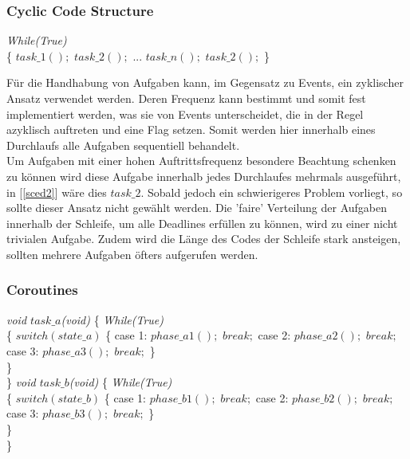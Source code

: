 \subsubsection{Cyclic Code Structure}
\begin{algorithm}
\label{sced2}
\begin{algorithmic}[1]

\BState \textit{While(True)}\\
\{
\State $task\_1();$
\State $task\_2();$
\State ...
\State $task\_n();$
\State $task\_2();$
\}

\end{algorithmic}
\end{algorithm}

Für die Handhabung von Aufgaben kann, im Gegensatz zu Events, ein zyklischer Ansatz verwendet werden. Deren Frequenz kann bestimmt und somit fest implementiert werden, was sie von Events unterscheidet, die in der Regel azyklisch auftreten und eine Flag setzen. Somit werden hier innerhalb eines Durchlaufs alle Aufgaben sequentiell behandelt.\\
Um Aufgaben mit einer hohen Auftrittsfrequenz besondere Beachtung schenken zu können wird diese Aufgabe innerhalb jedes Durchlaufes mehrmals ausgeführt, in [\ref{sced2}] wäre dies $task\_2$. Sobald jedoch ein schwierigeres Problem vorliegt, so sollte dieser Ansatz nicht gewählt werden. Die 'faire' Verteilung der Aufgaben innerhalb der Schleife, um alle Deadlines erfüllen zu können, wird zu einer nicht trivialen Aufgabe. Zudem wird die Länge des Codes der Schleife stark ansteigen, sollten mehrere Aufgaben öfters aufgerufen werden.

\subsubsection{Coroutines}

\begin{algorithm}
\label{sced3}
\begin{algorithmic}[1]

\BState \textit{void $task\_a$(void)}
\{
\BState \textit{While(True)}\\
\{
\State $switch(state\_a)$
\{
\State case 1: $phase\_a1();$
\State $break;$
\State case 2: $phase\_a2();$
\State $break;$
\State case 3: $phase\_a3();$
\State $break;$
\}\\
\}\\
\}
\newline
\BState \textit{void $task\_b$(void)}
\{
\BState \textit{While(True)}\\
\{
\State $switch(state\_b)$
\{
\State case 1: $phase\_b1();$
\State $break;$
\State case 2: $phase\_b2();$
\State $break;$
\State case 3: $phase\_b3();$
\State $break;$
\}\\
\}\\
\}


\end{algorithmic}
\end{algorithm}

